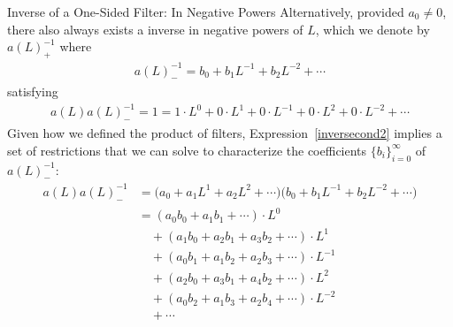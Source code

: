 \documentclass[aspectratio=169, handout]{beamer}
\begin{document}
{\scriptsize
\begin{frame}{Inverse of a One-Sided Filter: In Negative Powers}
Alternatively, provided $a_0\neq 0$, there also \alert{always} exists a
inverse in \alert{negative} powers of $L$, which we denote by
$a(L)^{-1}_+$ where
\begin{align*}
  a(L)^{-1}_- = b_0 + b_1 L^{-1} + b_2 L^{-2} + \cdots
\end{align*}
satisfying
\begin{align}
  a(L)a(L)^{-1}_- = 1
  = 1\cdot L^0 + 0 \cdot L^1 + 0 \cdot L^{-1} + 0 \cdot L^2 + 0 \cdot
  L^{-2} + \cdots
  \label{inversecond2}
\end{align}
Given how we defined the product of filters,
Expression~\ref{inversecond2} implies a \alert{set of restrictions} that
we can solve to characterize the coefficients $\{b_i\}_{i=0}^\infty$ of
$a(L)^{-1}_-$:
\begin{align*}
  a(L)
  a(L)^{-1}_-
  &=
  \big(
   a_0 + a_1 L^1 + a_2 L^2 + \cdots
  \big)
  \big(
  b_0 + b_1 L^{-1} + b_2 L^{-2} + \cdots
  \big)
  \\
  &=
  (a_0b_0 + a_1 b_1 + \cdots) \cdot L^0
  \\
  &
  \quad
  +
  (a_1 b_0 + a_2b_1 + a_3 b_2 + \cdots) \cdot L^1
  \\
  &
  \quad
  +
  (a_0 b_1 + a_1b_2 + a_2 b_3 + \cdots) \cdot L^{-1}
  \\
  &
  \quad
  +
  (a_2 b_0 + a_3b_1 + a_4 b_2 + \cdots) \cdot L^{2}
  \\
  &
  \quad
  +
  (a_0 b_2 + a_1b_3 + a_2 b_4 + \cdots) \cdot L^{-2}
  \\
  &
  \quad
  +\cdots
\end{align*}
\end{frame}
}
\end{document}
